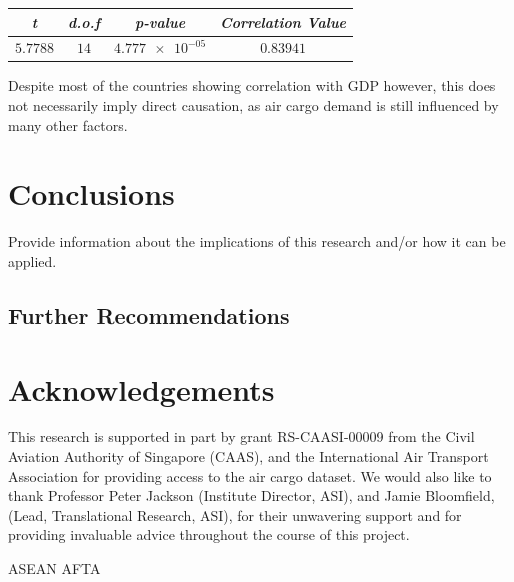 \documentclass{article}
\begin{document}
\begin{center}
\begin{tabular}{ |c|c|c|c| } 
 \hline
  \textit{t} & \textit{d.o.f} & \textit{p-value} & \textit{Correlation Value} \\
 \hline
  $5.7788$ & $14$ & $\num{4.777e-05}$ & $0.83941$  \\
 \hline
\end{tabular}
\end{center} 
\hspace{1}

\noindent Despite most of the countries showing correlation with GDP however, this does not necessarily imply direct causation, as air cargo demand is still influenced by many other factors. 

\section{Conclusions}
Provide information about the implications of this research and/or how it can be applied.

\subsection{Further Recommendations}

\section*{Acknowledgements}
This research is supported in part by grant RS-CAASI-00009 from the Civil Aviation Authority of Singapore (CAAS), and the International Air Transport Association for providing access to the air cargo dataset. We would also like to thank Professor Peter Jackson (Institute Director, ASI), and Jamie Bloomfield, (Lead, Translational Research, ASI), for their unwavering support and for providing invaluable advice throughout the course of this project. 




\noindent ASEAN AFTA
\end{document}
